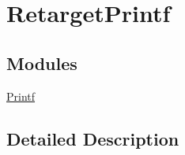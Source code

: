 \hypertarget{group___retarget_printf}{}\section{Retarget\+Printf}
\label{group___retarget_printf}
\subsection*{Modules}
\begin{DoxyCompactItemize}
\item 
\hyperlink{group__printf}{Printf}
\end{DoxyCompactItemize}


\subsection{Detailed Description}
